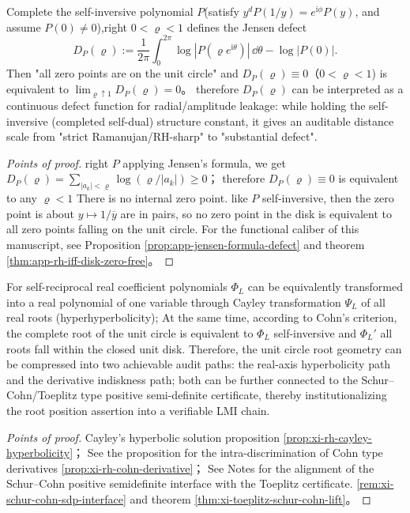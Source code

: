 \begin{conclusion}\label{con:xi-jensen-defect-horizon-entropy-distance}
Complete the self-inversive polynomial \(P\)(satisfy \(y^dP(1/y)=e^{\mathrm{i}\phi}P(y)\), and assume \(P(0)\neq 0\)),right \(0<\varrho<1\) defines the Jensen defect
\[
D_P(\varrho):=\frac{1}{2\pi}\int_{0}^{2\pi}\log|P(\varrho e^{\mathrm{i}\theta})|\,\dd\theta-\log|P(0)|.
\]
Then "all zero points are on the unit circle" and \(D_P(\varrho)\equiv 0\)（\(0<\varrho<1\)) is equivalent to
\(\lim_{\varrho\uparrow 1}D_P(\varrho)=0\)。
therefore \(D_P(\varrho)\) can be interpreted as a continuous defect function for radial/amplitude leakage: while holding the self-inversive (completed self-dual) structure constant, it gives an auditable distance scale from "strict Ramanujan/RH-sharp" to "substantial defect".
\end{conclusion}
\begin{proof}[Points of proof]
right \(P\) applying Jensen’s formula, we get \(D_P(\varrho)=\sum_{|a_k|<\varrho}\log(\varrho/|a_k|)\ge 0\)；
therefore \(D_P(\varrho)\equiv 0\) is equivalent to any \(\varrho<1\) There is no internal zero point.
like \(P\) self-inversive, then the zero point is about \(y\mapsto 1/\overline y\) are in pairs, so no zero point in the disk is equivalent to all zero points falling on the unit circle.
For the functional caliber of this manuscript, see Proposition \ref{prop:app-jensen-formula-defect} and theorem \ref{thm:app-rh-iff-disk-zero-free}。
\end{proof}

\begin{conclusion}\label{con:xi-cayley-cohn-lmi-certificate-chain}
For self-reciprocal real coefficient polynomials \(\Phi_L\) can be equivalently transformed into a real polynomial of one variable through Cayley transformation \(\Psi_L\) of all real roots (hyperhyperbolicity);
At the same time, according to Cohn's criterion, the complete root of the unit circle is equivalent to \(\Phi_L\) self-inversive and \(\Phi_L'\) all roots fall within the closed unit disk.
Therefore, the unit circle root geometry can be compressed into two achievable audit paths: the real-axis hyperbolicity path and the derivative indiskness path; both can be further connected to the Schur--Cohn/Toeplitz type positive semi-definite certificate, thereby institutionalizing the root position assertion into a verifiable LMI chain.
\end{conclusion}
\begin{proof}[Points of proof]
Cayley's hyperbolic solution proposition \ref{prop:xi-rh-cayley-hyperbolicity}；
See the proposition for the intra-discrimination of Cohn type derivatives \ref{prop:xi-rh-cohn-derivative}；
See Notes for the alignment of the Schur--Cohn positive semidefinite interface with the Toeplitz certificate. \ref{rem:xi-schur-cohn-sdp-interface} and theorem \ref{thm:xi-toeplitz-schur-cohn-lift}。
\end{proof}

